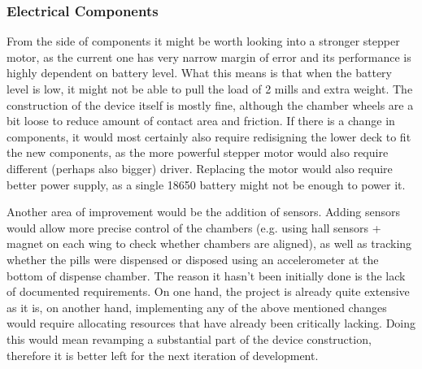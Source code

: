 \subsubsection{Electrical Components}
From the side of components it might be worth looking into a stronger stepper motor, as the current one has very narrow margin of error and its performance is highly dependent on battery level. What this means is that when the battery level is low, it might not be able to pull the load of 2 mills and extra weight. The construction of the device itself is mostly fine, although the chamber wheels are a bit loose to reduce amount of contact area and friction. If there is a change in components, it would most certainly also require redisigning the lower deck to fit the new components, as the more powerful stepper motor would also require different (perhaps also bigger) driver.  Replacing the motor would also require better power supply, as a single 18650 battery might not be enough to power it. 

Another area of improvement would be the addition of sensors. Adding sensors would allow more precise control of the chambers (e.g. using hall sensors + magnet on each wing to check whether chambers are aligned), as well as tracking whether the pills were dispensed or disposed using an accelerometer at the bottom of dispense chamber.
The reason it hasn't been initially done is the lack of documented requirements. On one hand, the project is already quite extensive as it is, on another hand, implementing any of the above mentioned changes would require allocating resources that have already been critically lacking. Doing this would mean revamping a substantial part of the device construction, therefore it is better left for the next iteration of development.

